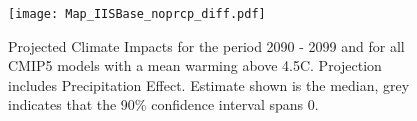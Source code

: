 \documentclass[11pt, letterpaper]{article}
\numberwithin{algorithm}{section}
\numberwithin{assumption}{section}
\numberwithin{lemma}{section}
\numberwithin{theorem}{section}
\numberwithin{corollary}{section}
\numberwithin{remark}{section}
\numberwithin{equation}{section}
\numberwithin{figure}{section}
\numberwithin{table}{section}
\begin{document}
\begin{figure}[!htbp]  \vspace{-.35in}
\centering
\texttt{[image: Map\_IISBase\_noprcp\_diff.pdf]}
\caption{Projected Climate Impacts for the period 2090 - 2099 and for all CMIP5 models with a mean warming above 4.5\textdegree C. Projection includes Precipitation Effect. Estimate shown is the median, grey indicates that the 90\% confidence interval spans 0.}
\label{fig_projection_map}
\end{figure}
\end{document}
